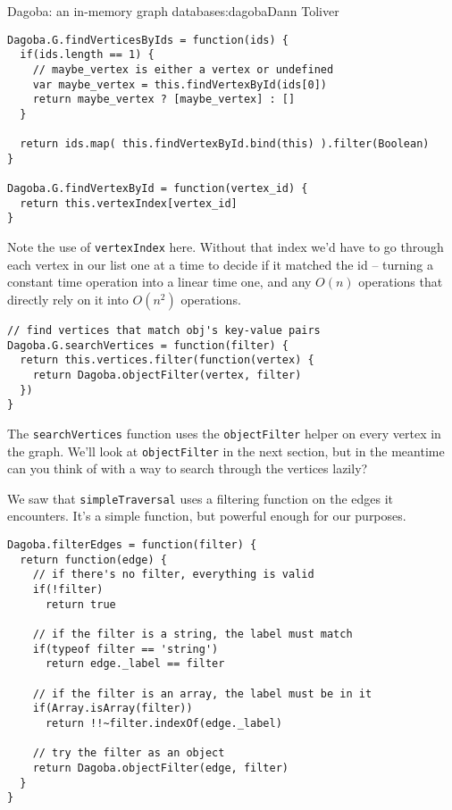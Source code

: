 \begin{aosachapter}{Dagoba: an in-memory graph database}{s:dagoba}{Dann Toliver}
\begin{verbatim}
Dagoba.G.findVerticesByIds = function(ids) {
  if(ids.length == 1) {
    // maybe_vertex is either a vertex or undefined
    var maybe_vertex = this.findVertexById(ids[0])                
    return maybe_vertex ? [maybe_vertex] : []
  }
  
  return ids.map( this.findVertexById.bind(this) ).filter(Boolean) 
}

Dagoba.G.findVertexById = function(vertex_id) {
  return this.vertexIndex[vertex_id] 
}
\end{verbatim}

Note the use of \texttt{vertexIndex} here. Without that index we'd have
to go through each vertex in our list one at a time to decide if it
matched the id -- turning a constant time operation into a linear time
one, and any $O(n)$ operations that directly rely on it into $O(n^2)$
operations.

\begin{verbatim}
// find vertices that match obj's key-value pairs
Dagoba.G.searchVertices = function(filter) {            
  return this.vertices.filter(function(vertex) {
    return Dagoba.objectFilter(vertex, filter)
  })
}
\end{verbatim}

The \texttt{searchVertices} function uses the \texttt{objectFilter}
helper on every vertex in the graph. We'll look at \texttt{objectFilter}
in the next section, but in the meantime can you think of with a way to
search through the vertices lazily?

\label{filtering}

We saw that \texttt{simpleTraversal} uses a filtering function on the
edges it encounters. It's a simple function, but powerful enough for our
purposes.

\begin{verbatim}
Dagoba.filterEdges = function(filter) {
  return function(edge) {
    // if there's no filter, everything is valid
    if(!filter)                                
      return true
    
    // if the filter is a string, the label must match
    if(typeof filter == 'string')              
      return edge._label == filter
    
    // if the filter is an array, the label must be in it
    if(Array.isArray(filter))                  
      return !!~filter.indexOf(edge._label)

    // try the filter as an object
    return Dagoba.objectFilter(edge, filter)   
  }
}
\end{verbatim}


\end{aosachapter}
